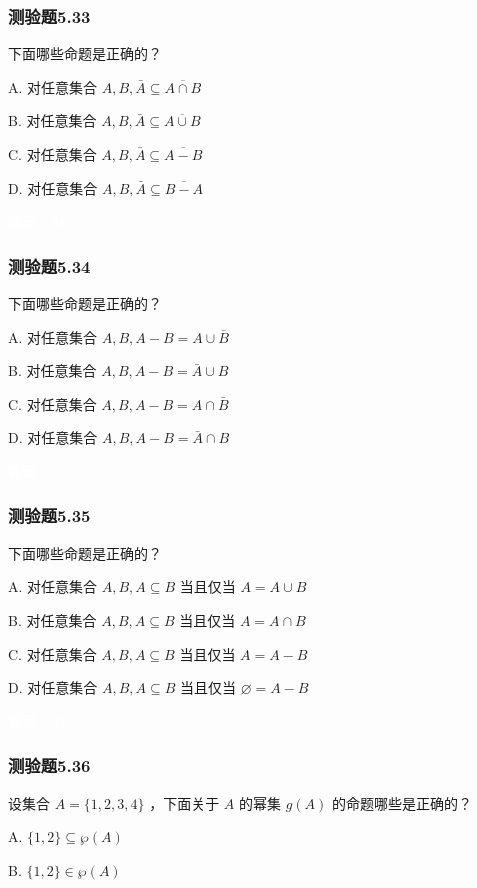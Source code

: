 \documentclass[UTF8, heading=true]{ctexart}
\begin{document}
\subsubsection{测验题5.33}

下面哪些命题是正确的？

A. 对任意集合 $A, B, \bar{A} \subseteq \overline{A \cap B}$

B. 对任意集合 $A, B, \bar{A} \subseteq \overline{A \cup B}$

C. 对任意集合 $A, B, \bar{A} \subseteq \overline{A-B}$

D. 对任意集合 $A, B, \bar{A} \subseteq \overline{B-A}$

\textcolor{white}{答案：AC}

\subsubsection{测验题5.34}
下面哪些命题是正确的？

A. 
对任意集合 $A, B, A-B=A \cup \bar{B}$

B. 对任意集合 $A, B, A-B=\bar{A} \cup B$

C. 对任意集合 $A, B, A-B=A \cap \bar{B}$

D. 对任意集合 $A, B, A-B=\bar{A} \cap B$

\textcolor{white}{答案：C}


\subsubsection{测验题5.35}
下面哪些命题是正确的？

A. 对任意集合 $A, B, A \subseteq B$ 当且仅当 $A=A \cup B$

B. 对任意集合 $A, B, A \subseteq B$ 当且仅当 $A=A \cap B$

C. 对任意集合 $A, B, A \subseteq B$ 当且仅当 $A=A-B$

D. 对任意集合 $A, B, A \subseteq B$ 当且仅当 $\varnothing=A-B$

\textcolor{white}{答案：BD}

\subsubsection{测验题5.36}

设集合 $A=\{1,2,3,4\}$ ，下面关于 $A$ 的幂集 $g(A)$ 的命题哪些是正确的？


A. $\{1,2\} \subseteq \wp(A) $

B. $\{1,2\} \in \wp(A) $
\end{document}
